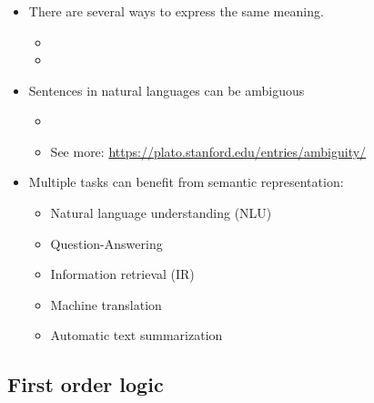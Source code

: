 \documentclass[xcolor=table]{beamer}
\begin{document}
\begin{frame}
	\frametitle{\insertshortsubtitle}
	\framesubtitle{\insertsection}
	
	\begin{itemize}
		\item There are several ways to express the same meaning.
		\begin{itemize}
			\item {}
			\item {}
		\end{itemize}
	
		\item Sentences in natural languages can be ambiguous
		\begin{itemize}
			\item {}
			\item See more: \url{https://plato.stanford.edu/entries/ambiguity/}
		\end{itemize}
	
		\item Multiple tasks can benefit from semantic representation:
		\begin{itemize}
			\item Natural language understanding (NLU)
			\item Question-Answering
			\item Information retrieval (IR)
			\item Machine translation
			\item Automatic text summarization
		\end{itemize}
	\end{itemize}
	
\end{frame}

\subsection{First order logic}
\end{document}
